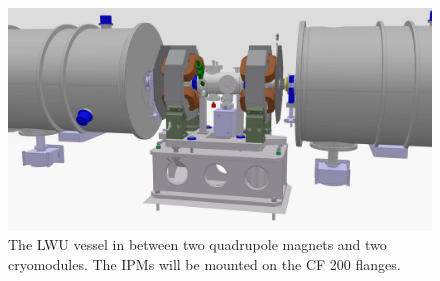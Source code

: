 \begin{figure}[ht]
	\includegraphics[width=\textwidth]{03_Prototype/figures/fig016_LWU_Cryo.jpeg}
	\caption[The LWU vessel in between two quadrupole magnets and two cryomodules]{The LWU vessel in between two quadrupole magnets and two cryomodules. The IPMs will be mounted on the CF 200 flanges. \color{red}{[Changer l'image car elle n'est pas à jours ...]}}
	\label{chap3:LWU_Cryo}
\end{figure}
